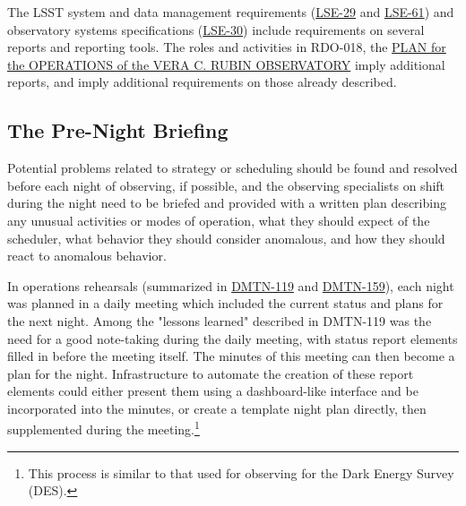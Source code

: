The LSST system and data management requirements (\href{https://ls.st/lse-29}{LSE-29} and \href{https://ls.st/lse-61}{LSE-61}) and observatory systems specifications (\href{https://ls.st/lse-30}{LSE-30}) include requirements on several reports and reporting tools. The roles and activities in RDO-018, the \href{https://docushare.lsst.org/docushare/dsweb/Get/RDO-018}{PLAN for the OPERATIONS of the VERA C. RUBIN OBSERVATORY} imply additional reports, and imply additional requirements on those already described.

\subsection{The Pre-Night Briefing}
\label{sec:org4f67084}

Potential problems related to strategy or scheduling should be found and resolved before each night of observing, if possible, and the observing specialists on shift during the night need to be briefed and provided with a written plan describing any unusual activities or modes of operation, what they should expect of the scheduler, what behavior they should consider anomalous, and how they should react to anomalous behavior.

In operations rehearsals (summarized in \href{https://dmtn-119.lsst.io}{DMTN-119} and \href{https://dmtn-159.lsst.io/}{DMTN-159}), each night was planned in a daily meeting which included the current status and plans for the next night.
Among the "lessons learned" described in DMTN-119 was the need for a good note-taking during the daily meeting, with status report elements filled in before the meeting itself. 
The minutes of this meeting can then become a plan for the night.
Infrastructure to automate the creation of these report elements could either present them using a dashboard-like interface and be incorporated into the minutes, or create a template night plan directly, then supplemented during the meeting.\footnote{This process is similar to that used for observing for the Dark Energy Survey (DES).}


